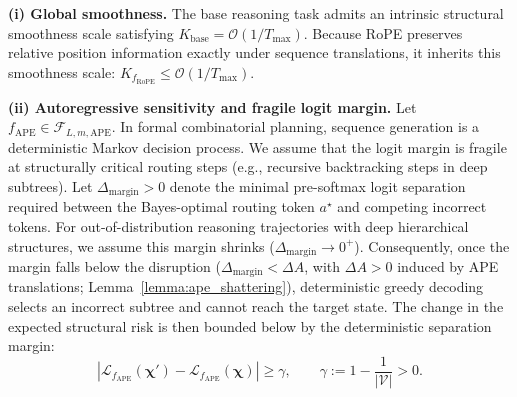 \textbf{(i) Global smoothness.}
The base reasoning task admits an intrinsic structural smoothness scale satisfying $K_{\mathrm{base}} = \mathcal{O}(1/T_{\max})$. Because RoPE preserves relative position information exactly under sequence translations, it inherits this smoothness scale: $K_{f_{\mathrm{RoPE}}} \le \mathcal{O}(1/T_{\max})$.

\textbf{(ii) Autoregressive sensitivity and fragile logit margin.} Let $f_{\mathrm{APE}} \in \mathcal{F}_{L,m,\mathrm{APE}}$. In formal combinatorial planning, sequence generation is a deterministic Markov decision process. We assume that the logit margin is fragile at structurally critical routing steps (e.g., recursive backtracking steps in deep subtrees). Let $\Delta_{\mathrm{margin}} > 0$ denote the minimal pre-softmax logit separation required between the Bayes-optimal routing token $a^\star$ and competing incorrect tokens. For out-of-distribution reasoning trajectories with deep hierarchical structures, we assume this margin shrinks ($\Delta_{\mathrm{margin}} \to 0^+$). Consequently, once the margin falls below the disruption ($\Delta_{\mathrm{margin}} < \Delta A$, with $\Delta A > 0$ induced by APE translations; Lemma~\ref{lemma:ape_shattering}), deterministic greedy decoding selects an incorrect subtree and cannot reach the target state. The change in the expected structural risk is then bounded below by the deterministic separation margin:
\begin{equation}
|\mathcal{L}_{f_{\mathrm{APE}}}(\boldsymbol{\chi}') - \mathcal{L}_{f_{\mathrm{APE}}}(\boldsymbol{\chi})| \ge \gamma, \qquad \gamma := 1 - \frac{1}{|\mathcal{V}|} > 0.
\end{equation}

